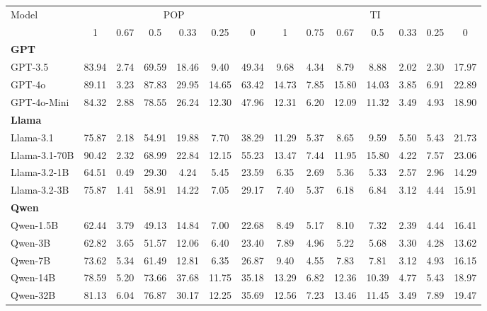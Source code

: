 \begin{table}[!tbp]
    \centering
    \tiny
    \begin{tabular}{l|cccccc|ccccccc}
        \hline
        \multirow{2}{*}{Model} & \multicolumn{6}{c|}{POP} & \multicolumn{7}{c}{TI} \\
        \cline{2-14}
        & 1 & 0.67 & 0.5 & 0.33 & 0.25 & 0 & 1 & 0.75 & 0.67 & 0.5 & 0.33 & 0.25 & 0 \\        \hline
        \multicolumn{14}{l}{\textbf{GPT}} \\
        \hline
        GPT-3.5 & 83.94 & 2.74 & 69.59 & 18.46 & 9.40 & 49.34 & 9.68 & 4.34 & 8.79 & 8.88 & 2.02 & 2.30 & 17.97 \\
        GPT-4o & 89.11 & 3.23 & 87.83 & 29.95 & 14.65 & 63.42 & 14.73 & 7.85 & 15.80 & 14.03 & 3.85 & 6.91 & 22.89 \\
        GPT-4o-Mini & 84.32 & 2.88 & 78.55 & 26.24 & 12.30 & 47.96 & 12.31 & 6.20 & 12.09 & 11.32 & 3.49 & 4.93 & 18.90 \\
        \hline
        \multicolumn{14}{l}{\textbf{Llama}} \\
        \hline
        Llama-3.1 & 75.87 & 2.18 & 54.91 & 19.88 & 7.70 & 38.29 & 11.29 & 5.37 & 8.65 & 9.59 & 5.50 & 5.43 & 21.73 \\
        Llama-3.1-70B & 90.42 & 2.32 & 68.99 & 22.84 & 12.15 & 55.23 & 13.47 & 7.44 & 11.95 & 15.80 & 4.22 & 7.57 & 23.06 \\
        Llama-3.2-1B & 64.51 & 0.49 & 29.30 & 4.24 & 5.45 & 23.59 & 6.35 & 2.69 & 5.36 & 5.33 & 2.57 & 2.96 & 14.29 \\
        Llama-3.2-3B & 75.87 & 1.41 & 58.91 & 14.22 & 7.05 & 29.17 & 7.40 & 5.37 & 6.18 & 6.84 & 3.12 & 4.44 & 15.91 \\
        \hline
        \multicolumn{14}{l}{\textbf{Qwen}} \\
        \hline
        Qwen-1.5B & 62.44 & 3.79 & 49.13 & 14.84 & 7.00 & 22.68 & 8.49 & 5.17 & 8.10 & 7.32 & 2.39 & 4.44 & 16.41 \\
        Qwen-3B & 62.82 & 3.65 & 51.57 & 12.06 & 6.40 & 23.40 & 7.89 & 4.96 & 5.22 & 5.68 & 3.30 & 4.28 & 13.62 \\
        Qwen-7B & 73.62 & 5.34 & 61.49 & 12.81 & 6.35 & 26.87 & 9.40 & 4.55 & 7.83 & 7.81 & 3.12 & 4.93 & 16.15 \\
        Qwen-14B & 78.59 & 5.20 & 73.66 & 37.68 & 11.75 & 35.18 & 13.29 & 6.82 & 12.36 & 10.39 & 4.77 & 5.43 & 18.97 \\
        Qwen-32B & 81.13 & 6.04 & 76.87 & 30.17 & 12.25 & 35.69 & 12.56 & 7.23 & 13.46 & 11.45 & 3.49 & 7.89 & 19.47 \\

\end{tabular}
\end{table}
